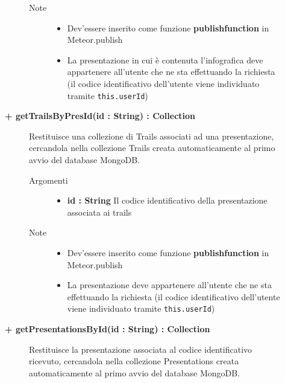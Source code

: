 \begin{description}
\begin{description}
\begin{description}
\begin{itemize}
				\end{itemize}
			\item[Note] \hfill
			\begin{itemize}
					\item Dev'essere inserito come funzione \textbf{publishfunction} in Meteor.publish
					\item La presentazione in cui è contenuta l'infografica deve appartenere all'utente che ne sta effettuando la richiesta (il codice identificativo dell'utente viene individuato tramite \texttt{this.userId})
				\end{itemize}
		\end{description}
	\end{description}
	
	\begin{description}
		\item[\textbf{\color{blue}+ getTrailsByPresId(id : String) : Collection			}] \hfill
			Restituisce una collezione di Trails associati ad una presentazione, cercandola nella collezione Trails creata automaticamente al primo avvio del database MongoDB. 
			
		\begin{description}
			\item[Argomenti] \hfill
				\begin{itemize}
				
					\item \textbf{id : String			} \hfill
					Il codice identificativo della presentazione associata ai trails
					
				\end{itemize}
			\item[Note] \hfill
			\begin{itemize}
					\item Dev'essere inserito come funzione \textbf{publishfunction} in Meteor.publish
					\item La presentazione deve appartenere all'utente che ne sta effettuando la richiesta (il codice identificativo dell'utente viene individuato tramite \texttt{this.userId})
				\end{itemize}
		\end{description}
	\end{description}
	
	\begin{description}
		\item[\textbf{\color{blue}+ getPresentationsById(id : String) : Collection			}] \hfill
			Restituisce la presentazione associata al codice identificativo ricevuto, cercandola nella collezione Presentations creata automaticamente al primo avvio del database MongoDB.
			

\end{description}
\end{description}
